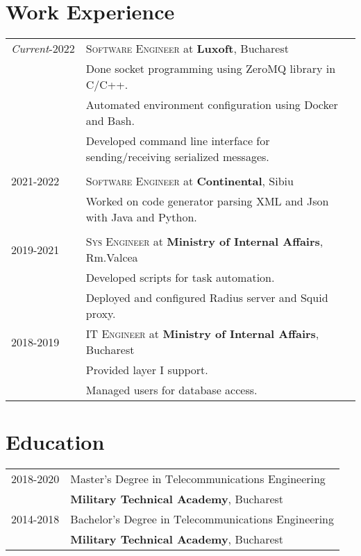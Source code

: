 \documentclass[a4paper,12pt]{article}
\newcommand{\tsc}{\textsc}
\begin{document}
\section{Work Experience}
    \begin{tabular}{p{3.1cm}|l}
        \raggedleft\emph{Current}\tsc{-2022}
        &\tsc{Software Engineer} at \textbf{Luxoft}, Bucharest\\
        &\footnotesize{Done socket programming using ZeroMQ library in C/C++.}\\
        &\footnotesize{Automated environment configuration using Docker and Bash.}\\
        &\footnotesize{Developed command line interface for sending/receiving serialized messages.}\\
        \multicolumn{2}{c}{}\\
        \raggedleft\tsc{2021-2022}
        &\tsc{Software Engineer} at \textbf{Continental}, Sibiu\\
        &\footnotesize{Worked on code generator parsing XML and Json with Java and Python.}\\
        \multicolumn{2}{c}{}\\
        \raggedleft\tsc{2019-2021} 
          &\tsc{Sys Engineer} at \textbf{Ministry of Internal Affairs}, Rm.Valcea\\
        &\footnotesize{Developed scripts for task automation.}\\
        &\footnotesize{Deployed and configured Radius server and Squid proxy.}\\
        \raggedleft\tsc{2018-2019} 
        &\tsc{IT Engineer} at \textbf{Ministry of Internal Affairs}, Bucharest\\
        &\footnotesize{Provided layer I support.}\\
        &\footnotesize{Managed users for database access.}\\
    \end{tabular}

\section{Education}
\begin{tabular}{p{3.1cm}|l}
    \raggedleft\tsc{2018-2020}&Master's Degree in \tsc{T}elecommunications \tsc{E}ngineering\\
        & \textbf{Military Technical Academy}, Bucharest\\
    \raggedleft\tsc{2014-2018}&Bachelor's Degree in \tsc{T}elecommunications \tsc{E}ngineering\\
        &\textbf{Military Technical Academy}, Bucharest\\
\end{tabular}
\end{document}
